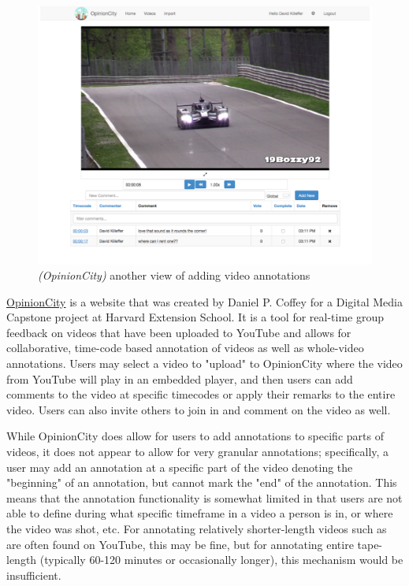 
\begin{figure}[ht]
	\includegraphics[width=\textwidth]{gfx/opinion-city/car2.pdf}
	\caption{\textit{(OpinionCity)} another view of adding video annotations} 
	\label{fig:opinioncity:adding-video-annotations-view2}
\end{figure}

\href{http://opinion.city}{OpinionCity} is a website that was created by Daniel P. Coffey for a Digital Media Capstone project at Harvard Extension School.  It is a tool for real-time group feedback on videos that have been uploaded to YouTube and allows for collaborative, time-code based annotation of videos as well as whole-video annotations.  Users may select a video to "upload" to OpinionCity where the video from YouTube will play in an embedded player, and then users can add comments to the video at specific timecodes or apply their remarks to the entire video.  Users can also invite others to join in and comment on the video as well. 

While OpinionCity does allow for users to add annotations to specific parts of videos, it does not appear to allow for very granular annotations; specifically, a user may add an annotation at a specific part of the video denoting the "beginning" of an annotation, but cannot mark the "end" of the annotation.  This means that the annotation functionality is somewhat limited in that users are not able to define during what specific timeframe in a video a person is in, or where the video was shot, etc.  For annotating relatively shorter-length videos such as are often found on YouTube, this may be fine, but for annotating entire tape-length (typically 60-120 minutes or occasionally longer), this mechanism would be insufficient. 


